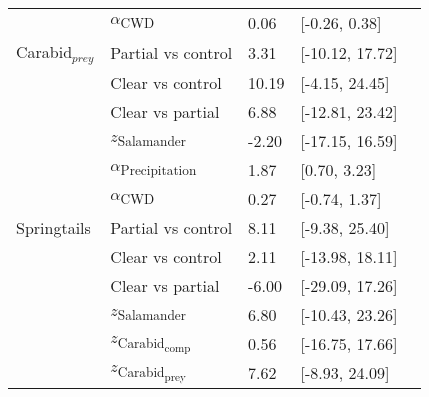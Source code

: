 \documentclass{article}
\begin{document}
\begin{table}[ht]
\begin{tabular}{lllll}
                            & $\alpha$\textsubscript{CWD} & \hspace{1mm}0.06 & [-0.26, 0.38] \\
        Carabid$_{prey}$    & Partial vs control & \hspace{1mm}3.31 & [-10.12, 17.72] \\
                            & Clear vs control & \hspace{1mm}10.19 & [-4.15, 24.45] \\ 
                            & Clear vs partial & \hspace{1mm}6.88 & [-12.81, 23.42] \\  
                            & $z$\textsubscript{Salamander} & -2.20 & [-17.15, 16.59] \\  
                            & $\alpha$\textsubscript{Precipitation} & \hspace{1mm}1.87 & [0.70, 3.23] \\
                            & $\alpha$\textsubscript{CWD} & \hspace{1mm}0.27 & [-0.74, 1.37] \\
        Springtails         & Partial vs control & \hspace{1mm}8.11 & [-9.38, 25.40] \\
                            & Clear vs control & \hspace{1mm}2.11 & [-13.98, 18.11] \\ 
                            & Clear vs partial & -6.00 & [-29.09, 17.26] \\  
                            & $z$\textsubscript{Salamander} & \hspace{1mm}6.80 & [-10.43, 23.26] \\ 
                            & $z$\textsubscript{Carabid\textsubscript{comp}} & \hspace{1mm}0.56 & [-16.75, 17.66] \\ 
                            & $z$\textsubscript{Carabid\textsubscript{prey}} & \hspace{1mm}7.62 & [-8.93, 24.09] \\ 
        \hline
    \end{tabular}
  \end{table}

 
\end{document}
